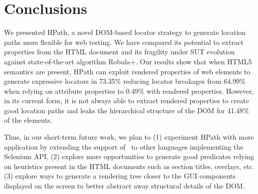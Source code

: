 \section{Conclusions}

We presented HPath, a novel DOM-based locator strategy to generate location paths more flexible for web testing. We have compared its potential to extract properties from the HTML document and its fragility under SUT evolution against state-of-the-art algorithm Robula+. Our results show that when HTML5 semantics are present, HPath can exploit rendered properties of web elements to generate expressive locators in 73.35\% reducing locator breakages from 64.99\% when relying on attribute properties to 0.49\% with rendered properties. However, in its current form, it is not always able to extract rendered properties to create good location paths and  leaks the hierarchical structure of the DOM for 41.48\% of the elements.

Thus, in our short-term future work, we plan to (1) experiment HPath with more application by extending the support of \mercator\ to other languages implementing the Selenium API, (2) explore more opportunities to generate good predicates relying on heuristics present in the HTML documents such as section titles, overlays, etc. (3) explore ways to generate a rendering tree closer to the GUI components displayed on the screen to better abstract away structural details of the DOM.